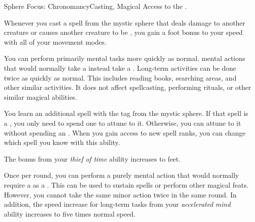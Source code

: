     \begin{feat}{Sphere Focus: Chronomancy}{Casting, Magical}
        \featpre Access to the  .

         Whenever you cast a spell from the  mystic sphere that deals damage to another creature or causes another creature to be \slowed, you  gain a  foot bonus to your speed with all of your movement modes.

         You can perform primarily mental tasks more quickly as normal.
         mental actions that would normally take a  instead take a .
        Long-term activities can be done twice as quickly as normal.
        This includes reading books, searching areas, and other similar activities.
        It does not affect spellcasting, performing rituals, or other similar magical abilities.

         You learn an additional spell with the  tag from the  mystic sphere.
        If that spell is a , you only need to spend one  to attune to it.
        Otherwise, you can attune to it without spending an .
        When you gain access to new spell ranks, you can change which spell you know with this ability.

         The bonus from your \textit{thief of time} ability increases to  feet.

         Once per round, you can perform a purely mental action that would normally require a  as a .
        This can be used to sustain spells or perform other magical feats.
        However, you cannot take the same minor action twice in the same round.
        In addition, the speed increase for long-term tasks from your \textit{accelerated mind} ability increases to five times normal speed.
    \end{feat}

